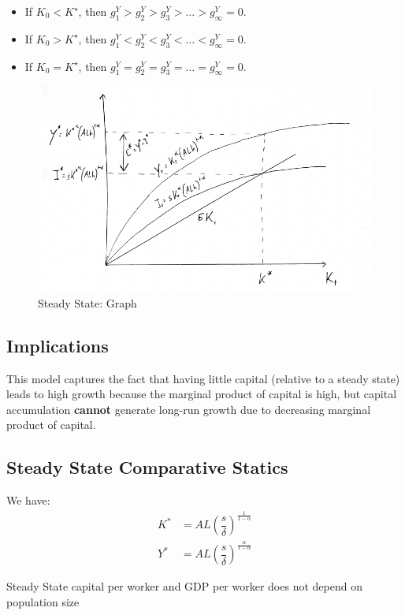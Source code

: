 \documentclass[11pt]{article}
\begin{document}
\begin{itemize}
    \item If $K_0<K^{\star}$, then $g_1^Y>g_2^Y>g_3^Y>\ldots>g_{\infty}^Y=0$.
    \item If $K_0>K^{\star}$, then $g_1^Y<g_2^Y<g_3^Y<\ldots<g_{\infty}^Y=0$.
    \item If $K_0=K^{\star}$, then $g_1^Y=g_2^Y=g_3^Y=\ldots=g_{\infty}^Y=0$.
\end{itemize}

\begin{figure}[h]
    \centering
    \includegraphics[width=12cm]{photos/steady state: graph.png}
    \caption{Steady State: Graph}
    \label{fig:steady state capital}
\end{figure}

\begin{mdframed}
\subsection{Implications}
This model captures the fact that having little capital (relative to a steady state) leads to high growth because the marginal product of capital is high, but capital accumulation \textbf{cannot} generate long-run growth due to decreasing marginal product of capital. 
\end{mdframed}

\subsection{Steady State Comparative Statics}

We have:
\begin{align}
    K^* &= AL\left(\dfrac{s}{\delta}\right)^{\frac{1}{1-\alpha}} \\
    Y^* &= AL\left(\dfrac{s}{\delta}\right)^{\frac{\alpha}{1-\alpha}}
\end{align}
\begin{note}
    Steady State capital per worker and GDP per worker does not depend on population size
\end{note}
\end{document}

